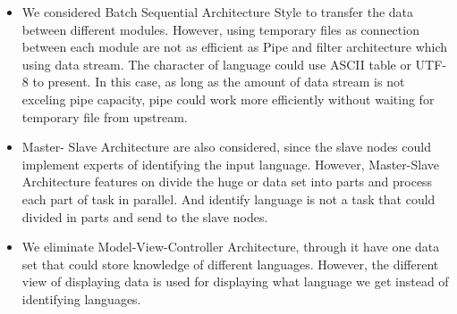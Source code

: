 \begin{itemize}
    \item We considered Batch Sequential Architecture Style to transfer the data between different modules. However, using temporary files as connection between each module are not as efficient as Pipe and filter architecture which using data stream. The character of language could use ASCII table or UTF-8 to present. In this case, as long as the amount of data stream is not exceling pipe capacity, pipe could work more efficiently without waiting for temporary file from upstream.
    \item Master- Slave Architecture are also considered, since the slave nodes could implement experts of identifying the input language. However, Master-Slave Architecture features on divide the huge or data set into parts and process each part of task in parallel. And identify language is not a task that could divided in parts and send to the slave nodes. 
    \item We eliminate Model-View-Controller Architecture, through it have one data set that could store knowledge of different languages. However, the different view of displaying data is used for displaying what language we get instead of identifying languages. 
\end{itemize}

